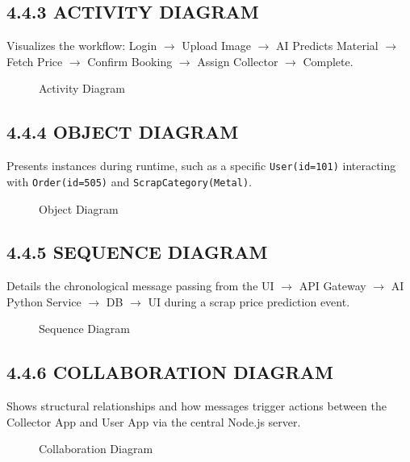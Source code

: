 \subsection{4.4.3 ACTIVITY DIAGRAM}
Visualizes the workflow: Login $\rightarrow$ Upload Image $\rightarrow$ AI Predicts Material $\rightarrow$ Fetch Price $\rightarrow$ Confirm Booking $\rightarrow$ Assign Collector $\rightarrow$ Complete.
\begin{figure}[H]
    \centering
    \vspace{4cm}
    \caption{Activity Diagram}
\end{figure}

\subsection{4.4.4 OBJECT DIAGRAM}
Presents instances during runtime, such as a specific \texttt{User(id=101)} interacting with \texttt{Order(id=505)} and \texttt{ScrapCategory(Metal)}.
\begin{figure}[H]
    \centering
    \vspace{4cm}
    \caption{Object Diagram}
\end{figure}

\subsection{4.4.5 SEQUENCE DIAGRAM}
Details the chronological message passing from the UI $\rightarrow$ API Gateway $\rightarrow$ AI Python Service $\rightarrow$ DB $\rightarrow$ UI during a scrap price prediction event.
\begin{figure}[H]
    \centering
    \vspace{4cm}
    \caption{Sequence Diagram}
\end{figure}

\subsection{4.4.6 COLLABORATION DIAGRAM}
Shows structural relationships and how messages trigger actions between the Collector App and User App via the central Node.js server.
\begin{figure}[H]
    \centering
    \vspace{4cm}
    \caption{Collaboration Diagram}
\end{figure}

